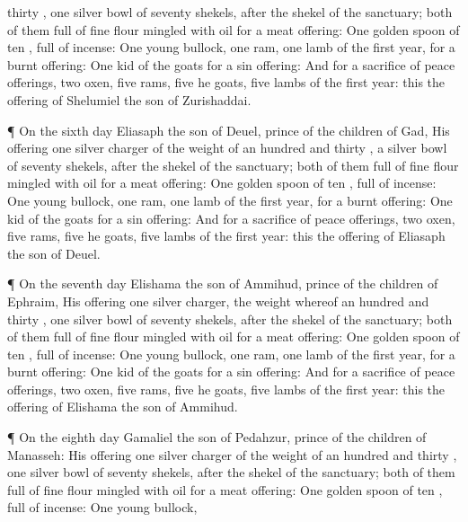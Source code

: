 {thirty
{},
one
silver
bowl of
seventy
shekels, after the
shekel of the
sanctuary;
both of them
full of fine
flour
mingled with
oil for a meat
offering:
One
golden
spoon of
ten
{},
full of
incense:
One
young
bullock,
one
ram,
one
lamb of the
first
year, for a burnt
offering:
One
kid of the
goats for a sin
offering:
And for a
sacrifice of peace
offerings,
two
oxen,
five
rams,
five he
goats,
five
lambs of the
first
year: this
{} the
offering of
Shelumiel the
son of
Zurishaddai.
\par }{\PP {}¶ On the
sixth
day
Eliasaph the
son of
Deuel,
prince of the
children of
Gad,
{}
His
offering
{}
one
silver
charger of the
weight of an
hundred and
thirty
{}, a
silver
bowl of
seventy
shekels, after the
shekel of the
sanctuary;
both of them
full of fine
flour
mingled with
oil for a meat
offering:
One
golden
spoon of
ten
{},
full of
incense:
One
young
bullock,
one
ram,
one
lamb of the
first
year, for a burnt
offering:
One
kid of the
goats for a sin
offering:
And for a
sacrifice of peace
offerings,
two
oxen,
five
rams,
five he
goats,
five
lambs of the
first
year: this
{} the
offering of
Eliasaph the
son of
Deuel.
\par }{\PP {}¶ On the
seventh
day
Elishama the
son of
Ammihud,
prince of the
children of
Ephraim,
{}
His
offering
{}
one
silver
charger, the
weight whereof
{} an
hundred and
thirty
{},
one
silver
bowl of
seventy
shekels, after the
shekel of the
sanctuary;
both of them
full of fine
flour
mingled with
oil for a meat
offering:
One
golden
spoon of
ten
{},
full of
incense:
One
young
bullock,
one
ram,
one
lamb of the
first
year, for a burnt
offering:
One
kid of the
goats for a sin
offering:
And for a
sacrifice of peace
offerings,
two
oxen,
five
rams,
five he
goats,
five
lambs of the
first
year: this
{} the
offering of
Elishama the
son of
Ammihud.
\par }{\PP {}¶ On the
eighth
day
{}
Gamaliel the
son of
Pedahzur,
prince of the
children of
Manasseh:
His
offering
{}
one
silver
charger of the
weight of an
hundred and
thirty
{},
one
silver
bowl of
seventy
shekels, after the
shekel of the
sanctuary;
both of them
full of fine
flour
mingled with
oil for a meat
offering:
One
golden
spoon of
ten
{},
full of
incense:
One
young
bullock,
}
